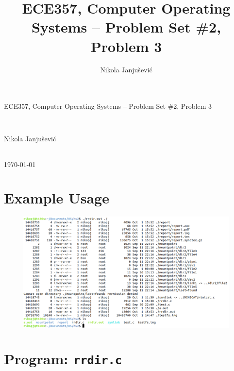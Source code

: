 \documentclass[10pt,a4paper]{article}
\author{Nikola Janju\v{s}evi\'{c}}
\title{ECE357, Computer Operating Systems -- Problem Set \#2, Problem 3}
\begin{document}
\begin{Large}
ECE357, Computer Operating Systems -- Problem Set \#2, Problem 3
\end{Large} \\
\begin{large}
Nikola Janju\v{s}evi\'{c}
\end{large} 
\\
\today

\section*{Example Usage}
\begin{figure}[h]
	\centering
	\includegraphics[width=\textwidth]{currentwd_ss2.png}
\end{figure}

\pagebreak
\section*{Program: \texttt{rrdir.c}}


\end{document}
